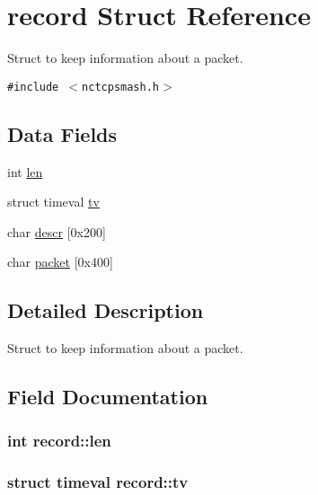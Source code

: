 \hypertarget{structrecord}{
\section{record Struct Reference}
\label{structrecord}
}
Struct to keep information about a packet.  


{\tt \#include $<$nctcpsmash.h$>$}

\subsection*{Data Fields}
\begin{CompactItemize}
\item 
int \hyperlink{structrecord_82ab97166f493082ecec56bed7b464eb}{len}
\item 
struct timeval \hyperlink{structrecord_fab961c5a8abc364a2f67ef742150f4c}{tv}
\item 
char \hyperlink{structrecord_c5821540379b383a222dc8a834582897}{descr} \mbox{[}0x200\mbox{]}
\item 
char \hyperlink{structrecord_f05696c59bf2b1370e3e786ef92f0bd2}{packet} \mbox{[}0x400\mbox{]}
\end{CompactItemize}


\subsection{Detailed Description}
Struct to keep information about a packet. 

\subsection{Field Documentation}
\hypertarget{structrecord_82ab97166f493082ecec56bed7b464eb}{
\subsubsection{\setlength{\rightskip}{0pt plus 5cm}int {\bf record::len}}}
\label{structrecord_82ab97166f493082ecec56bed7b464eb}


\hypertarget{structrecord_fab961c5a8abc364a2f67ef742150f4c}{
\subsubsection{\setlength{\rightskip}{0pt plus 5cm}struct timeval {\bf record::tv}}}
\label{structrecord_fab961c5a8abc364a2f67ef742150f4c}


